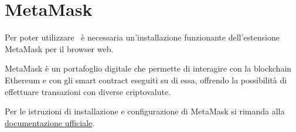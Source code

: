 \section{MetaMask}
Per poter utilizzare \capName\ è necessaria un'installazione funzionante dell'estensione MetaMask per il browser web.

MetaMask è un portafoglio digitale che permette di interagire con la blockchain Ethereum e con gli smart contract eseguiti su di essa, offrendo la possibilità di effettuare transazioni con diverse criptovalute.

Per le istruzioni di installazione e configurazione di MetaMask si rimanda alla \href{https://support.metamask.io/hc/en-us/articles/360015489531-Getting-started-with-MetaMask}{documentazione ufficiale}.
